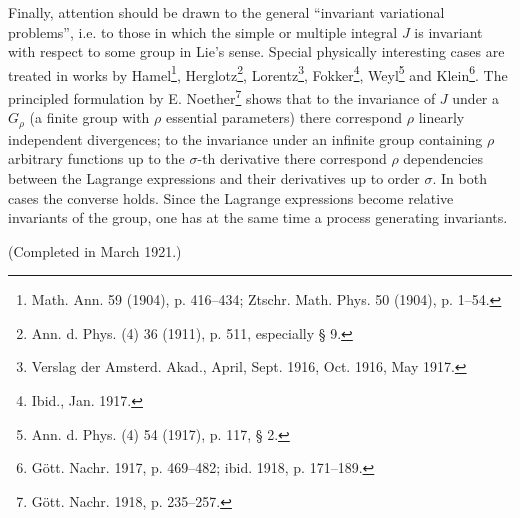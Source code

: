 \documentclass[11pt]{article}
\begin{document}
Finally, attention should be drawn to the general ``invariant variational problems'', i.e. to those in which the simple or multiple integral $J$ is invariant with respect to some group in Lie's sense. Special physically interesting cases are treated in works by Hamel\footnote{Math. Ann. 59 (1904), p. 416--434; Ztschr. Math. Phys. 50 (1904), p. 1--54.}, Herglotz\footnote{Ann. d. Phys. (4) 36 (1911), p. 511, especially § 9.}, Lorentz\footnote{Verslag der Amsterd. Akad., April, Sept. 1916, Oct. 1916, May 1917.}, Fokker\footnote{Ibid., Jan. 1917.}, Weyl\footnote{Ann. d. Phys. (4) 54 (1917), p. 117, § 2.} and Klein\footnote{Gött. Nachr. 1917, p. 469--482; ibid. 1918, p. 171--189.}. The principled formulation by E. Noether\footnote{Gött. Nachr. 1918, p. 235--257.} shows that to the invariance of $J$ under a $G_\rho$ (a finite group with $\rho$ essential parameters) there correspond $\rho$ linearly independent divergences; to the invariance under an infinite group containing $\rho$ arbitrary functions up to the $\sigma$-th derivative there correspond $\rho$ dependencies between the Lagrange expressions and their derivatives up to order $\sigma$. In both cases the converse holds. Since the Lagrange expressions become relative invariants of the group, one has at the same time a process generating invariants.

\begin{center}
(Completed in March 1921.)
\end{center}
\end{document}
